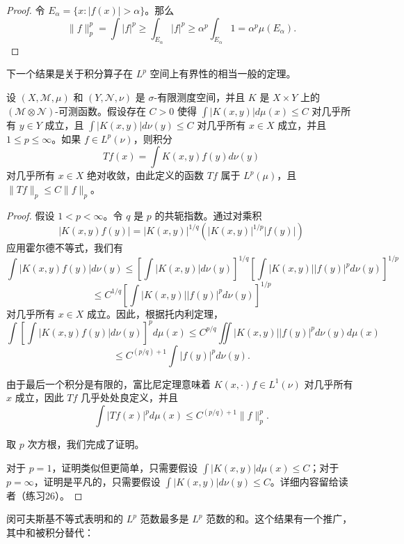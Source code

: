 \documentclass[lang=cn,10pt,thmcnt=section]{elegantbook}
\begin{document}
\begin{proof}
令 $E_\alpha = \{x : |f(x)| > \alpha\}$。那么
\[ \|f\|_p^p = \int |f|^p \geq \int_{E_\alpha} |f|^p \geq \alpha^p \int_{E_\alpha} 1 = \alpha^p \mu(E_\alpha). \]
\end{proof}

下一个结果是关于积分算子在 $L^p$ 空间上有界性的相当一般的定理。

\begin{theorem}\label{theorem6.18}
设 $(X, \mathcal{M}, \mu)$ 和 $(Y, \mathcal{N}, \nu)$ 是 $\sigma$-有限测度空间，并且 $K$ 是 $X \times Y$ 上的 $(\mathcal{M} \otimes \mathcal{N})$-可测函数。假设存在 $C > 0$ 使得 $\int |K(x,y)| d\mu(x) \leq C$ 对几乎所有 $y \in Y$ 成立，且 $\int |K(x,y)| d\nu(y) \leq C$ 对几乎所有 $x \in X$ 成立，并且 $1 \leq p \leq \infty$。如果 $f \in L^p(\nu)$，则积分
\[ Tf(x) = \int K(x,y)f(y) d\nu(y) \]
对几乎所有 $x \in X$ 绝对收敛，由此定义的函数 $Tf$ 属于 $L^p(\mu)$，且 $\|Tf\|_p \leq C\|f\|_p$。
\end{theorem}

\begin{proof}
假设 $1 < p < \infty$。令 $q$ 是 $p$ 的共轭指数。通过对乘积
\[ |K(x,y)f(y)| = |K(x,y)|^{1/q}(|K(x,y)|^{1/p}|f(y)|) \]
应用霍尔德不等式，我们有
\[ \int |K(x,y)f(y)| d\nu(y) \leq \left[ \int |K(x,y)| d\nu(y) \right]^{1/q} \left[ \int |K(x,y)| |f(y)|^p d\nu(y) \right]^{1/p} \]
\[ \leq C^{1/q} \left[ \int |K(x,y)| |f(y)|^p d\nu(y) \right]^{1/p} \]
对几乎所有 $x \in X$ 成立。因此，根据托内利定理，
\[ \int \left[ \int |K(x,y) f(y)| d\nu(y) \right]^p d\mu(x) \leq C^{p/q} \iint |K(x,y)| |f(y)|^p d\nu(y) d\mu(x) \]
\[ \leq C^{(p/q)+1} \int |f(y)|^p d\nu(y). \]

由于最后一个积分是有限的，富比尼定理意味着 $K(x,\cdot)f \in L^1(\nu)$ 对几乎所有 $x$ 成立，因此 $Tf$ 几乎处处良定义，并且
\[ \int |Tf(x)|^p d\mu(x) \leq C^{(p/q)+1}\|f\|_p^p. \]

取 $p$ 次方根，我们完成了证明。

对于 $p = 1$，证明类似但更简单，只需要假设 $\int |K(x,y)|d\mu(x) \leq C$；对于 $p = \infty$，证明是平凡的，只需要假设 $\int |K(x,y)|d\nu(y) \leq C$。详细内容留给读者（练习26）。
\end{proof}

闵可夫斯基不等式表明和的 $L^p$ 范数最多是 $L^p$ 范数的和。这个结果有一个推广，其中和被积分替代：
\end{document}
